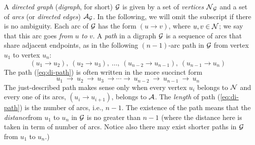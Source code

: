 A {\it directed graph} ({\it digraph}, for short) $\mbox{$\cal G$}$ is given by a set of {\it vertices}
$\mbox{$\cal N$}_{\mbox{{\scriptsize $\cal G$}}}$ and a set of {\it arcs} (or {\it directed edges}) $\mbox{$\cal A$}_{\mbox{{\scriptsize $\cal G$}}}$.
In the following, we will omit the subscript if there is no ambiguity.
Each arc of $\mbox{$\cal G$}$ has the form $(u \rightarrow v)$,
where $u, v \in \mbox{$\cal N$}$; we say that this arc goes {\em from} $u$ {\em to} $v$.  
A {\it path} in a digraph $\mbox{$\cal G$}$ is a sequence of arcs that share adjacent
endpoints, as in the following $(n-1)$-arc path in $\mbox{$\cal G$}$ from vertex $u_1$ to
vertex $u_n$:
\begin{equation}
\label{eq:di-path}
(u_1 \rightarrow u_2), \ (u_2 \rightarrow u_3), \ \ldots, \ (u_{n-2}
        \rightarrow u_{n-1}), \ (u_{n-1} \rightarrow u_n)
\end{equation}
The path (\ref{eq:di-path}) is often written in the more succinct form
\[
u_1 \ \rightarrow \ u_2 \ \rightarrow \ u_3 \ \rightarrow \cdots
\rightarrow \ u_{n-2} \ \rightarrow \ u_{n-1} \ \rightarrow \ u_n
\]
The just-described path makes sense only when every vertex $u_i$ belongs
to $\mbox{$\cal N$}$ and every one of its arcs, $(u_i \rightarrow u_{i+1})$,
belongs to $\mbox{$\cal A$}$.  The {\it length} of path (\ref{eq:di-path}) is
the number of arcs, i.e., $n-1$.  
  
The existence of the path means that the {\it distance}from
$u_1$ to $u_n$ in $\mbox{$\cal G$}$ is no greater than $n-1$ (where the distance here is taken
in term of number of arcs.  
Notice also there may exist shorter paths in $\mbox{$\cal G$}$ from $u_1$ to $u_n$.)

\bigskip

\noindent {}
\bigskip

